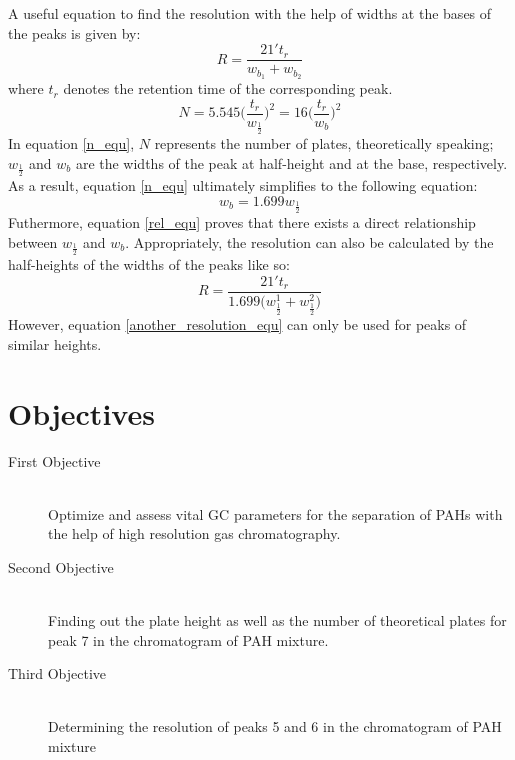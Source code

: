 \documentclass[a4paper, 12pt]{article}
\begin{document}
A useful equation to find the resolution with the help of widths at the bases of the peaks is given by:
\begin{equation} \label{resolution_equ}
    R = \frac{21't_r}{w_{b_1} + w_{b_2}}
\end{equation}
where \(t_r\) denotes the retention time of the corresponding peak.
\begin{equation} \label{n_equ}
    N = 5.545\Bigg(\frac{t_r}{w_\frac{1}{2}}\Bigg)^2 = 16\Bigg(\frac{t_r}{w_b}\Bigg)^2
\end{equation}
In equation \ref{n_equ}, \(N\) represents the number of plates, theoretically speaking; \(w_\frac{1}{2}\) and \(w_b\) are the widths of the peak at half-height and at the base, respectively. As a result, equation \ref{n_equ} ultimately simplifies to the following equation:
\begin{equation} \label{rel_equ}
    w_b = 1.699w_\frac{1}{2}
\end{equation}
Futhermore, equation \ref{rel_equ} proves that there exists a direct relationship between \(w_\frac{1}{2}\) and \(w_b\). Appropriately, the resolution can also be calculated by the half-heights of the widths of the peaks like so:
\begin{equation} \label{another_resolution_equ}
    R = \frac{21't_r}{1.699\Big(w_{\frac{1}{2}}^1 + w_{\frac{1}{2}}^2\Big)}
\end{equation}
However, equation \ref{another_resolution_equ} can only be used for peaks of similar heights.


\section{Objectives}

\begin{description}
	\item[First Objective] \hfill \\
	Optimize and assess vital GC parameters for the separation of PAHs with the help of high resolution gas chromatography.
	\item[Second Objective] \hfill \\
	Finding out the plate height as well as the number of theoretical plates for peak 7 in the chromatogram of PAH mixture.
	\item[Third Objective] \hfill \\
	Determining the resolution of peaks 5 and 6 in the chromatogram of PAH mixture
\end{description}
 
\end{document}
